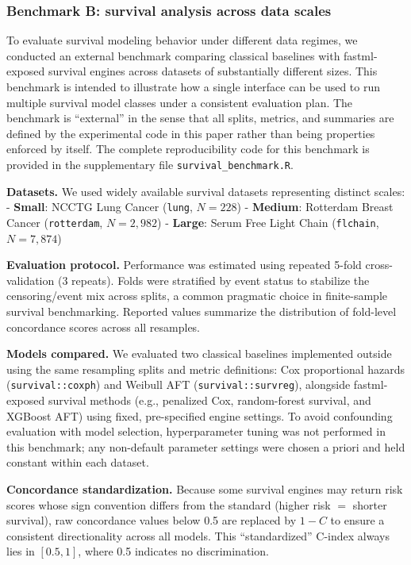 \subsubsection{Benchmark B: survival analysis across data scales}\label{benchmark-b-survival-analysis-across-data-scales}

To evaluate survival modeling behavior under different data regimes, we conducted an external benchmark comparing classical baselines with fastml-exposed survival engines across datasets of substantially different sizes. This benchmark is intended to illustrate how a single interface can be used to run multiple survival model classes under a consistent evaluation plan. The benchmark is ``external'' in the sense that all splits, metrics, and summaries are defined by the experimental code in this paper rather than being properties enforced by  itself. The complete reproducibility code for this benchmark is provided in the supplementary file \texttt{survival\_benchmark.R}.

\textbf{Datasets.}
We used widely available survival datasets representing distinct scales:
- \textbf{Small}: NCCTG Lung Cancer (\texttt{lung}, \(N = 228\)) \citep{Loprinzi:1994aa}
- \textbf{Medium}: Rotterdam Breast Cancer (\texttt{rotterdam}, \(N = 2,982\)) \citep{Foekens:2000aa}
- \textbf{Large}: Serum Free Light Chain (\texttt{flchain}, \(N = 7,874\)) \citep{Robert:2006aa}

\textbf{Evaluation protocol.}
Performance was estimated using repeated 5-fold cross-validation (3 repeats). Folds were stratified by event status to stabilize the censoring/event mix across splits, a common pragmatic choice in finite-sample survival benchmarking. Reported values summarize the distribution of fold-level concordance scores across all resamples.

\textbf{Models compared.}
We evaluated two classical baselines implemented outside  using the same resampling splits and metric definitions: Cox proportional hazards (\texttt{survival::coxph}) and Weibull AFT (\texttt{survival::survreg}), alongside fastml-exposed survival methods (e.g., penalized Cox, random-forest survival, and XGBoost AFT) using fixed, pre-specified engine settings. To avoid confounding evaluation with model selection, hyperparameter tuning was not performed in this benchmark; any non-default parameter settings were chosen a priori and held constant within each dataset.

\textbf{Concordance standardization.}
Because some survival engines may return risk scores whose sign convention differs from the standard (higher risk \(=\) shorter survival), raw concordance values below 0.5 are replaced by \(1 - C\) to ensure a consistent directionality across all models. This ``standardized'' C-index always lies in \([0.5, 1]\), where 0.5 indicates no discrimination.

